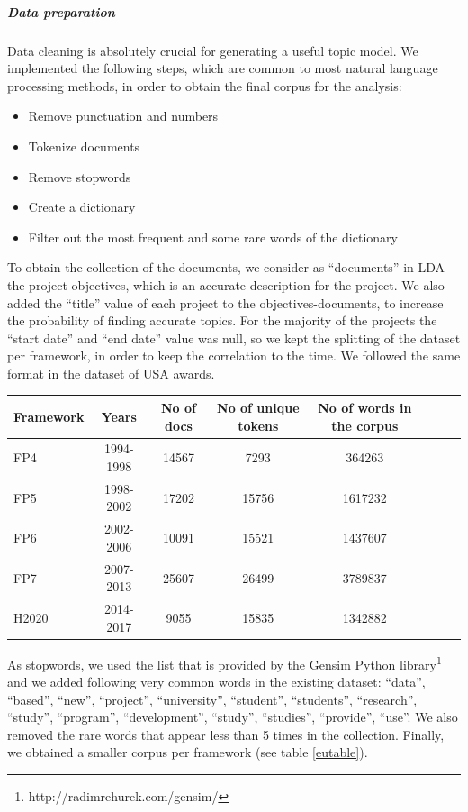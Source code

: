 \documentclass[12pt]{report}
\begin{document}
\subparagraph{Data preparation}

Data cleaning is absolutely crucial for generating a useful topic model. 
We implemented the following steps, which are common to most natural 
language processing methods, in order to obtain the final corpus for the 
analysis:

\begin{itemize}
\item Remove punctuation and numbers
\item Tokenize documents
\item Remove stopwords
\item Create a dictionary
\item Filter out the most frequent and some rare words of the dictionary
\end{itemize}

To obtain the collection of the documents, we consider as ``documents''
in LDA the project objectives, which is an accurate description for
the project. We also added the ``title'' value of each project to the
objectives-documents, to increase the probability of finding accurate
topics. For the majority of the projects the ``start date'' and ``end
date'' value was null, so we kept the splitting of the dataset per
framework, in order to keep the correlation to the time. We followed
the same format in the dataset of USA awards.

\begin{center}
\begin{tabular}{l*{6}{c}r}
Framework & Years & No of docs & No of unique tokens & No of words in the corpus \\
\hline
FP4 & 1994-1998 & 14567 & 7293 & 364263 \\
FP5 & 1998-2002 & 17202 & 15756 & 1617232 \\
FP6 & 2002-2006 & 10091 & 15521 & 1437607 \\
FP7 & 2007-2013 & 25607 & 26499 & 3789837 \\
H2020 & 2014-2017 & 9055 & 15835 & 1342882 \\
\end{tabular}
\label{eutable}
\end{center}

As stopwords, we used the list that is provided by the Gensim Python
library\footnote{http://radimrehurek.com/gensim/} and we added following very
common words in the existing dataset: ``data'', ``based'', ``new'', ``project'',
``university'', ``student'', ``students'', ``research'', ``study'', ``program'',
``development'', ``study'', ``studies'', ``provide'', ``use''. We also removed 
the rare words that appear less than 5 times in the collection. 
Finally, we obtained a smaller corpus per framework (see table \ref{eutable}).
\end{document}
